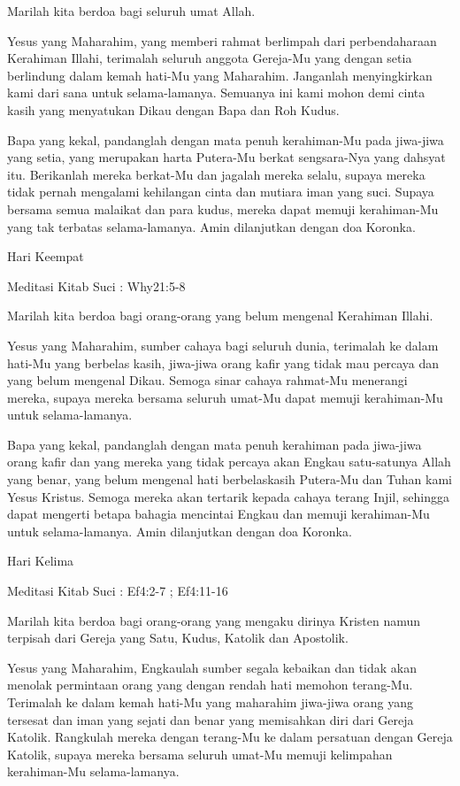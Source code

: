\documentclass[a5paper,headsepline,titlepage,11pt,nnormalheadings,DIVcalc]{scrbook}
\begin{document}
Marilah kita berdoa bagi seluruh umat Allah.

Yesus yang Maharahim, yang memberi rahmat berlimpah dari perbendaharaan Kerahiman Illahi, terimalah seluruh anggota Gereja-Mu yang dengan setia berlindung dalam kemah hati-Mu yang Maharahim. Janganlah menyingkirkan kami dari sana untuk selama-lamanya. Semuanya ini kami mohon demi cinta kasih yang menyatukan Dikau dengan Bapa dan Roh Kudus.

Bapa yang kekal, pandanglah dengan mata penuh kerahiman-Mu pada jiwa-jiwa yang setia, yang merupakan harta Putera-Mu berkat sengsara-Nya yang dahsyat itu. Berikanlah mereka berkat-Mu dan jagalah mereka selalu, supaya mereka tidak pernah mengalami kehilangan cinta dan mutiara iman yang suci. Supaya bersama semua malaikat dan para kudus, mereka dapat memuji kerahiman-Mu yang tak terbatas selama-lamanya. Amin
dilanjutkan dengan doa Koronka.


Hari Keempat

Meditasi Kitab Suci : Why21:5-8

Marilah kita berdoa bagi orang-orang yang belum mengenal Kerahiman Illahi.

Yesus yang Maharahim, sumber cahaya bagi seluruh dunia, terimalah ke dalam hati-Mu yang berbelas kasih, jiwa-jiwa orang kafir yang tidak mau percaya dan yang belum mengenal Dikau. Semoga sinar cahaya rahmat-Mu menerangi mereka, supaya mereka bersama seluruh umat-Mu dapat memuji kerahiman-Mu untuk selama-lamanya.

Bapa yang kekal, pandanglah dengan mata penuh kerahiman pada jiwa-jiwa orang kafir dan yang mereka yang tidak percaya akan Engkau satu-satunya Allah yang benar, yang belum mengenal hati berbelaskasih Putera-Mu dan Tuhan kami Yesus Kristus. Semoga mereka akan tertarik kepada cahaya terang Injil, sehingga dapat mengerti betapa bahagia mencintai Engkau dan memuji kerahiman-Mu untuk selama-lamanya. Amin
dilanjutkan dengan doa Koronka.


Hari Kelima

Meditasi Kitab Suci : Ef4:2-7 ; Ef4:11-16

Marilah kita berdoa bagi orang-orang yang mengaku dirinya Kristen namun terpisah dari Gereja yang Satu, Kudus, Katolik dan Apostolik.

Yesus yang Maharahim, Engkaulah sumber segala kebaikan dan tidak akan menolak permintaan orang yang dengan rendah hati memohon terang-Mu. Terimalah ke dalam kemah hati-Mu yang maharahim jiwa-jiwa orang yang tersesat dan iman yang sejati dan benar yang memisahkan diri dari Gereja Katolik. Rangkulah mereka dengan terang-Mu ke dalam persatuan dengan Gereja Katolik, supaya mereka bersama seluruh umat-Mu memuji kelimpahan kerahiman-Mu selama-lamanya.
\end{document}
